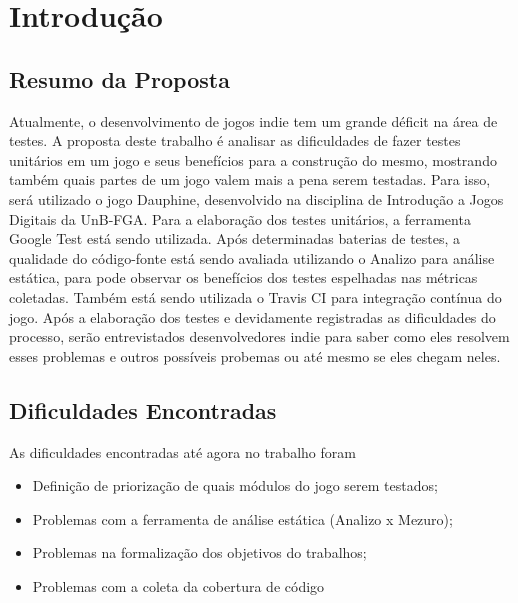 \chapter[Introdução]{Introdução}

\section{Resumo da Proposta}
Atualmente, o desenvolvimento de jogos indie tem um grande déficit na área de testes. A proposta deste trabalho é analisar as dificuldades de fazer testes unitários em um jogo e seus benefícios para a construção do mesmo, mostrando também quais partes de um jogo valem mais a pena serem testadas. Para isso, será utilizado o jogo Dauphine, desenvolvido na disciplina de Introdução a Jogos Digitais da UnB-FGA. Para a elaboração dos testes unitários, a ferramenta Google Test está sendo utilizada. Após determinadas baterias de testes, a qualidade do código-fonte está sendo avaliada utilizando o Analizo para análise estática, para pode observar os benefícios dos testes espelhadas nas métricas coletadas. Também está sendo utilizada o Travis CI para integração contínua do jogo. Após a elaboração dos testes e devidamente registradas as dificuldades do processo, serão entrevistados desenvolvedores indie para saber como eles resolvem esses problemas e outros possíveis probemas ou até mesmo se eles chegam neles.

\section{Dificuldades Encontradas}
As dificuldades encontradas até agora no trabalho foram
\begin{itemize}
\item Definição de priorização de quais módulos do jogo serem testados;
\item Problemas com a ferramenta de análise estática (Analizo x Mezuro);
\item Problemas na formalização dos objetivos do trabalhos;
\item Problemas com a coleta da cobertura de código
\end{itemize}
